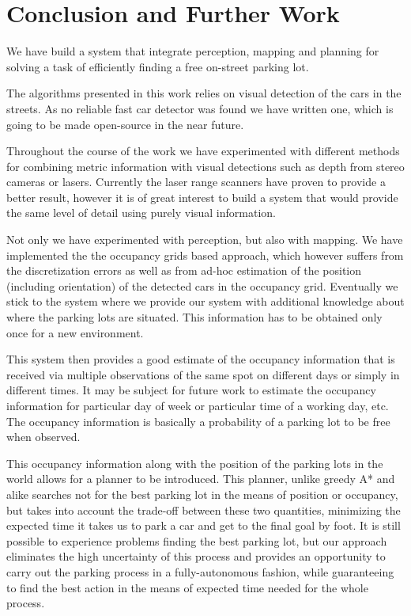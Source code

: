 
\chapter{Conclusion and Further Work} %
\label{cha:conclusion_and_further_work}
    We have build a system that integrate perception, mapping and planning for solving a task of efficiently finding a free on-street parking lot.

    The algorithms presented in this work relies on visual detection of the cars in the streets. As no reliable fast car detector was found we have written one, which is going to be made open-source in the near future.

    Throughout the course of the work we have experimented with different methods for combining metric information with visual detections such as depth from stereo cameras or lasers. Currently the laser range scanners have proven to provide a better result, however it is of great interest to build a system that would provide the same level of detail using purely visual information.

    Not only we have experimented with perception, but also with mapping. We have implemented the the occupancy grids based approach, which however suffers from the discretization errors as well as from ad-hoc estimation of the position (including orientation) of the detected cars in the occupancy grid. Eventually we stick to the system where we provide our system with additional knowledge about where the parking lots are situated. This information has to be obtained only once for a new environment.

    This system then provides a good estimate of the occupancy information that is received via multiple observations of the same spot on different days or simply in different times. It may be subject for future work to estimate the occupancy information for particular day of week or particular time of a working day, etc. The occupancy information is basically a probability of a parking lot to be free when observed.

    This occupancy information along with the position of the parking lots in the world allows for a planner to be introduced. This planner, unlike greedy A* and alike searches not for the best parking lot in the means of position or occupancy, but takes into account the trade-off between these two quantities, minimizing the expected time it takes us to park a car and get to the final goal by foot. It is still possible to experience problems finding the best parking lot, but our approach eliminates the high uncertainty of this process and provides an opportunity to carry out the parking process in a fully-autonomous fashion, while guaranteeing to find the best action in the means of expected time needed for the whole process.

